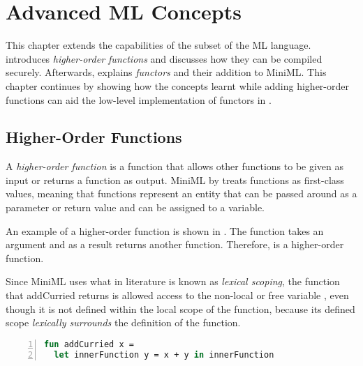 \documentclass[10pt,a4paper,master=cws, masteroption=ai,english,inputenc=utf8]{kulemt}
\begin{document}
\chapter{Advanced ML Concepts}

This chapter extends the capabilities of the subset of the ML language.  introduces \emph{higher-order functions} and discusses how they can be compiled securely. Afterwards,  explains \emph{functors} and their addition to MiniML. This chapter continues by showing how the concepts learnt while adding higher-order functions can aid the low-level implementation of functors in .

\section{Higher-Order Functions\label{sec:HOF}}

A \emph{higher-order function} is a function that allows other functions to be given as input or returns a function as output. \mbox{MiniML} by treats functions as first-class values, meaning that functions represent an entity that can be passed around as a parameter or return value and can be assigned to a variable.

\smallskip
An example of a higher-order function is shown in . 
The function  takes an argument  and as a result returns another function.
Therefore,  is a higher-order function.

Since \mbox{MiniML} uses what in literature is known as \emph{lexical scoping}, the function that addCurried returns is allowed access to the non-local or free variable , even though it is not defined within the local scope of the function, because its defined scope \emph{lexically surrounds} the definition of the function.


\begin{lstlisting}[frame=single, language=ML,caption=The use of lexical scoping calls for closures., label=code:LexicalScopingExample,numbers=left]
fun addCurried x = 
  let innerFunction y = x + y in innerFunction
\end{lstlisting}
\label{code:LexicalScopingExample}
\end{document}
